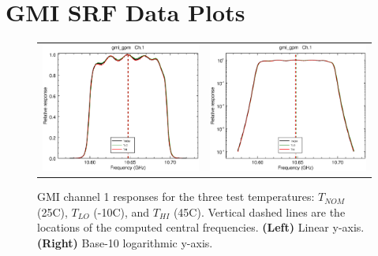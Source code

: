 \section{GMI SRF Data Plots}
\label{app.srf_data_plots}
\newpage

\begin{figure}[htp]
  \centering
  \begin{tabular}{c c}
    \includegraphics[scale=0.3]{graphics/lin/gmi_gpm-1.eps} &
    \includegraphics[scale=0.3]{graphics/log/gmi_gpm-1.eps}
  \end{tabular}
  \caption{GMI channel 1 responses for the three test temperatures: $T_{NOM}$ (25\textdegree{}C), $T_{LO}$ (-10\textdegree{}C), and $T_{HI}$ (45\textdegree{}C). Vertical dashed lines are the locations of the computed central frequencies. \textbf{(Left)} Linear y-axis. \textbf{(Right)} Base-10 logarithmic y-axis.}
  \label{fig:ch1_response}
\end{figure}

